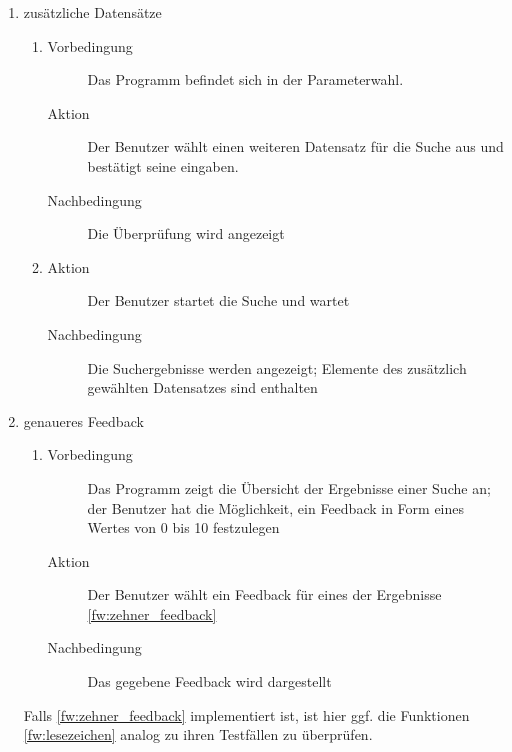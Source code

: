 \begin{enumerate} [label=\bfseries /TSW \arabic*0/, leftmargin=*]
	\item zusätzliche Datensätze \label{ts:mehrere_datensaetze_waehlen}
	\begin{enumerate}[leftmargin=0pt]
		\item
		\begin{description}
			\item[Vorbedingung] Das Programm befindet sich in der Parameterwahl.
			\item[Aktion] Der Benutzer wählt einen weiteren Datensatz für die Suche aus und bestätigt seine eingaben.
			\item[Nachbedingung] Die Überprüfung wird angezeigt
		\end{description}
		\item
		\begin{description}
			\item[Aktion] Der Benutzer startet die Suche und wartet
			\item[Nachbedingung] Die Suchergebnisse werden angezeigt; Elemente des zusätzlich gewählten Datensatzes sind enthalten
		\end{description}
	\end{enumerate}

	\item genaueres Feedback \label{ts:zehner_feedback}
	\begin{enumerate}[leftmargin=0pt]
		\item
		\begin{description}
			\item[Vorbedingung] Das Programm zeigt die Übersicht der Ergebnisse einer Suche an; der Benutzer hat die Möglichkeit, ein Feedback in Form eines Wertes von 0 bis 10 festzulegen
			\item[Aktion] Der Benutzer wählt ein Feedback für eines der Ergebnisse \ref{fw:zehner_feedback}
			\item[Nachbedingung] Das gegebene Feedback wird dargestellt
		\end{description}
	\end{enumerate}
	Falls \ref{fw:zehner_feedback} implementiert ist, ist hier ggf. die Funktionen \ref{fw:lesezeichen} analog zu ihren Testfällen zu überprüfen.
\end{enumerate}

